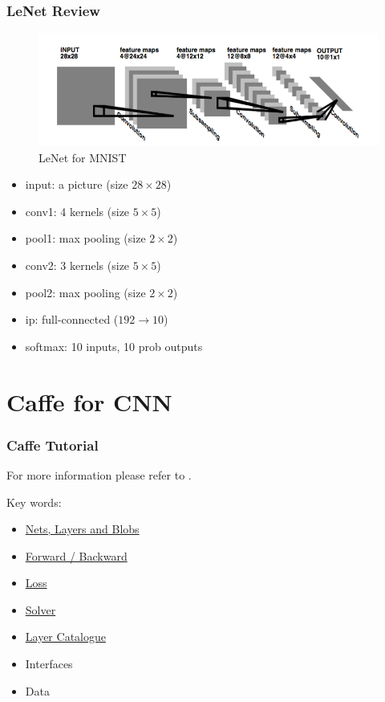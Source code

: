\documentclass{beamer}
\begin{document}
\begin{frame}[label=review]
\frametitle{LeNet Review}
\begin{figure}[htbp]
\centerline{\includegraphics[width=\textwidth]{lenet.jpg}}
\caption[3]{LeNet for MNIST}
\end{figure}\par
\begin{itemize}
\item input: a picture (size $28\times 28$)
\item conv1: 4 kernels (size $5\times 5$)
\item pool1: max pooling (size $2\times 2$)
\item conv2: 3 kernels (size $5\times 5$)
\item pool2: max pooling (size $2\times 2$)
\item ip: full-connected ($192\to 10$)
\item softmax: 10 inputs, 10 prob outputs 
\end{itemize}
\end{frame}

\section{Caffe for CNN}
\begin{frame}
\frametitle{Caffe Tutorial}
For more information please refer to \href{http://furoc.net/2015/10/18/caffe\_learning/}{\color{blue}{this page}}.\par
Key words:\par
\begin{itemize}
\item \hyperlink{net}{Nets, Layers and Blobs}
\item \hyperlink{ward}{Forward / Backward}
\item \hyperlink{loss}{Loss}
\item \hyperlink{solver}{Solver}
\item \hyperlink{cata}{Layer Catalogue}
\item Interfaces
\item Data
\end{itemize}
\end{frame}
\end{document}
